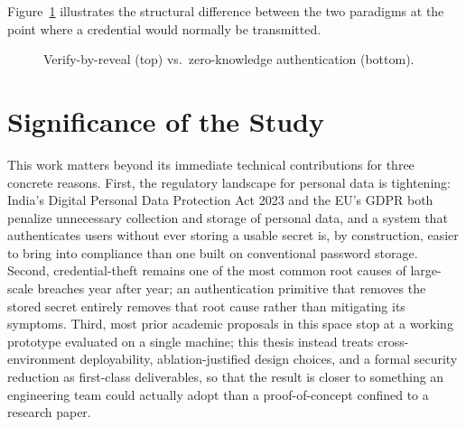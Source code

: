 \documentclass[12pt,a4paper,oneside]{report}
\begin{document}
Figure~\ref{fig:verify_by_reveal_vs_zk} illustrates the structural
difference between the two paradigms at the point where a credential
would normally be transmitted.

\begin{figure}[htbp]
\centering
{}
\caption{Verify-by-reveal (top) vs.\ zero-knowledge authentication (bottom).}
\label{fig:verify_by_reveal_vs_zk}
\end{figure}

\section{Significance of the Study}

This work matters beyond its immediate technical contributions for three
concrete reasons. First, the regulatory landscape for personal data is
tightening: India's Digital Personal Data Protection Act 2023 and the
EU's GDPR both penalize unnecessary collection and storage of personal
data, and a system that authenticates users without ever storing a
usable secret is, by construction, easier to bring into compliance than
one built on conventional password storage. Second, credential-theft
remains one of the most common root causes of large-scale breaches
year after year; an authentication primitive that removes the stored
secret entirely removes that root cause rather than mitigating its
symptoms. Third, most prior academic proposals in this space stop at a
working prototype evaluated on a single machine; this thesis instead
treats cross-environment deployability, ablation-justified design
choices, and a formal security reduction as first-class deliverables,
so that the result is closer to something an engineering team could
actually adopt than a proof-of-concept confined to a research paper.
\end{document}
